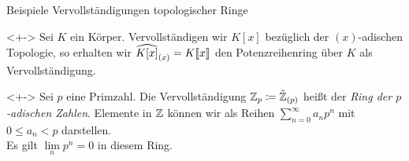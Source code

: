 \begin{frame}{Beispiele Vervollständigungen topologischer Ringe}
	\begin{example}<+->
		Sei \(K\) ein Körper. Vervollständigen wir \(K[x]\) bezüglich der \((x)\)-adischen Topologie, so erhalten
		wir \(\widehat{K[x]}_{(x)} = K\llbracket x\rrbracket\) den Potenzreihenring über \(K\) als Vervollständigung.
	\end{example}
	\begin{example}<+->
		Sei \(p\) eine Primzahl. Die Vervollständigung \(\mathbb Z_p \coloneqq \hat{\mathbb Z}_{(p)}\) heißt der
		\emph{Ring der \(p\)-adischen Zahlen}. Elemente in \(\mathbb Z\) können wir als Reihen
		\(\sum_{n = 0}^\infty a_n p^n\) mit \(0 \le a_n < p\) darstellen.
		\\
		Es gilt \(\lim\limits_n p^n = 0\) in diesem Ring.
	\end{example}
\end{frame}


